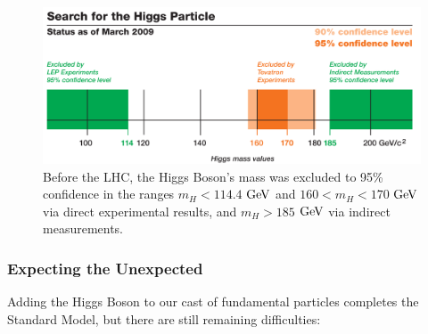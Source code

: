 \begin{figure}[H]
\begin{center}
\includegraphics[width=.6\linewidth]{Introduction/figures/HiggsExclusions_09.jpg}
\caption[Higgs Mass Limits Before the LHC]{Before the LHC, the Higgs Boson's mass was excluded to 95\% confidence in the ranges $m_{H}<114.4$ $\rm{GeV}$ and $160<m_{H}<170$ $\rm{GeV}$ via direct experimental results, and $m_{H}>185$ $\rm{GeV}$ via indirect measurements.}
\label{fig:HiggsExclusionPreLHC}
\end{center}
\end{figure}

\subsubsection{Expecting the Unexpected}
\label{sec:findingBSM}

Adding the Higgs Boson to our cast of fundamental particles completes the Standard Model, but there are still remaining difficulties:

